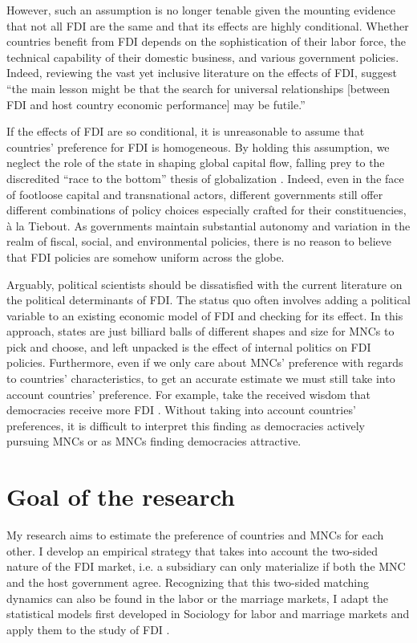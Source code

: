 However, such an assumption is no longer tenable given the mounting evidence
that not all FDI are the same and that its effects are highly conditional.
Whether countries benefit from FDI depends on the sophistication of their labor
force, the technical capability of their domestic business, and various
government policies. Indeed, reviewing the vast yet inclusive literature on the
effects of FDI, \citet{Lipsey2005} suggest ``the main lesson might be that the
search for universal relationships [between FDI and host country economic
performance] may be futile.''

If the effects of FDI are so conditional, it is unreasonable to assume that
countries' preference for FDI is homogeneous. By holding this assumption, we
neglect the role of the state in shaping global capital flow, falling prey to
the discredited ``race to the bottom'' thesis of globalization
\citep{Mosley2005}. Indeed, even in the face of footloose capital and
transnational actors, different governments still offer different combinations
of policy choices especially crafted for their constituencies, \`a la Tiebout.
As governments maintain substantial autonomy and variation in the realm of
fiscal, social, and environmental policies, there is no reason to believe that
FDI policies are somehow uniform across the globe.

Arguably, political scientists should be dissatisfied with the current
literature on the political determinants of FDI. The status quo often involves adding a
political variable to an existing economic model of FDI and checking for its
effect. In this approach, states are just billiard balls of different shapes and
size for MNCs to pick and choose, and left unpacked is the effect of internal
politics on FDI policies. Furthermore, even if we only care about MNCs'
preference with regards to countries' characteristics, to get an accurate
estimate we must still take into account countries' preference. For example,
take the received wisdom that democracies receive more FDI \citep{Jensen2008a}.
Without taking into account countries' preferences, it is difficult to interpret
this finding as democracies actively pursuing MNCs or as MNCs finding
democracies attractive.

\section{Goal of the research}

My research aims to estimate the preference of countries and MNCs for each
other. I develop an empirical strategy that takes into account the two-sided
nature of the FDI market, i.e. a subsidiary can only materialize if both the MNC
and the host government agree. Recognizing that this two-sided matching dynamics
can also be found in the labor or the marriage markets, I adapt the statistical
models first developed in Sociology for labor and marriage markets and apply
them to the study of FDI \citep{Logan1996, Logan2008}.

